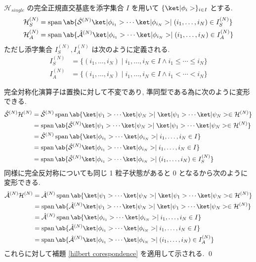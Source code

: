 \documentclass[uplatex,dvipdfmx,a4paper,11pt]{jlreq}
\makeatletter
\DeclareMathOperator{\Span}{span}
\newcommand{\HH}{\mathcal{H}}
\renewcommand{\S}{\mathcal{S}}
\newcommand{\A}{\mathcal{A}}
\numberwithin{equation}{section}
\theoremstyle{definition}
\renewenvironment{proof}[1][\proofname]{\par
  \normalfont
  \topsep6\p@\@plus6\p@ \trivlist
  \item[\hskip\labelsep{\bfseries #1}\@addpunct{\bfseries}]\ignorespaces\quad\par
}{%
  \qed\endtrivlist\@endpefalse
}
\renewcommand\proofname{証明}
\makeatother
\begin{document}
\begin{proposition}[Q21-16, Q21-17, Q21-18]
  $\HH_{single}$ の完全正規直交基底を添字集合 $I$ を用いて $\{\ket|\phi_i>\}_{i\in I}$ とする.
  \begin{align}
    \HH_S^{(N)} & = \Span\ab\{\hat{\S}^{(N)}\ket|\phi_{i_1}>\cdots\ket|\phi_{i_N}> \mid (i_1,\ldots,i_N)\in I_S^{(N)} \} \\
    \HH_A^{(N)} & = \Span\ab\{\hat{\A}^{(N)}\ket|\phi_{i_1}>\cdots\ket|\phi_{i_N}> \mid (i_1,\ldots,i_N)\in I_A^{(N)} \}
  \end{align}
  ただし添字集合 $I_S^{(N)}, I_A^{(N)}$ は次のように定義される.
  \begin{align}
    I_S^{(N)} & = \{(i_1,\ldots,i_N)\mid i_1,\ldots,i_N\in I\land i_1\leq\cdots\leq i_{N}\} \\
    I_A^{(N)} & = \{(i_1,\ldots,i_N)\mid i_1,\ldots,i_N\in I\land i_1<\cdots<i_{N}\}
  \end{align}
\end{proposition}
\begin{proof}
  完全対称化演算子は置換に対して不変であり, 準同型である為に次のように変形できる.
  \begin{align}
    \hat{\S}^{(N)}\HH^{(N)} & = \hat{\S}^{(N)}\Span\ab\{\ket|\psi_1>\cdots\ket|\psi_N> \mid \ket|\psi_1>\cdots\ket|\psi_N>\in\HH^{(N)} \} \\
                            & = \Span\ab\{\hat{\S}^{(N)}\ket|\psi_1>\cdots\ket|\psi_N> \mid \ket|\psi_1>\cdots\ket|\psi_N>\in\HH^{(N)} \} \\
                            & = \hat{\S}^{(N)}\Span\ab\{\ket|\phi_{i_1}>\cdots\ket|\phi_{i_N}> \mid i_1,\ldots,i_N\in I\}                 \\
                            & = \Span\ab\{\hat{\S}^{(N)}\ket|\phi_{i_1}>\cdots\ket|\phi_{i_N}> \mid i_1,\ldots,i_N\in I\}                 \\
                            & = \Span\ab\{\hat{\S}^{(N)}\ket|\phi_{i_1}>\cdots\ket|\phi_{i_N}> \mid (i_1,\ldots,i_N)\in I_S^{(N)} \}
  \end{align}
  同様に完全反対称についても同じ 1 粒子状態があると 0 となるから次のように変形できる.
  \begin{align}
    \hat{\A}^{(N)}\HH^{(N)} & = \hat{\A}^{(N)}\Span\ab\{\ket|\psi_1>\cdots\ket|\psi_N> \mid \ket|\psi_1>\cdots\ket|\psi_N>\in\HH^{(N)} \} \\
                            & = \Span\ab\{\hat{\A}^{(N)}\ket|\psi_1>\cdots\ket|\psi_N> \mid \ket|\psi_1>\cdots\ket|\psi_N>\in\HH^{(N)} \} \\
                            & = \hat{\A}^{(N)}\Span\ab\{\ket|\phi_{i_1}>\cdots\ket|\phi_{i_N}> \mid i_1,\ldots,i_N\in I \}                \\
                            & = \Span\ab\{\hat{\A}^{(N)}\ket|\phi_{i_1}>\cdots\ket|\phi_{i_N}> \mid i_1,\ldots,i_N\in I \}                \\
                            & = \Span\ab\{\hat{\A}^{(N)}\ket|\phi_{i_1}>\cdots\ket|\phi_{i_N}> \mid (i_1,\ldots,i_N)\in I_A^{(N)} \}
  \end{align}
  これらに対して補題 \ref{hilbert corespondence} を適用して示される.
\end{proof}
\end{document}
